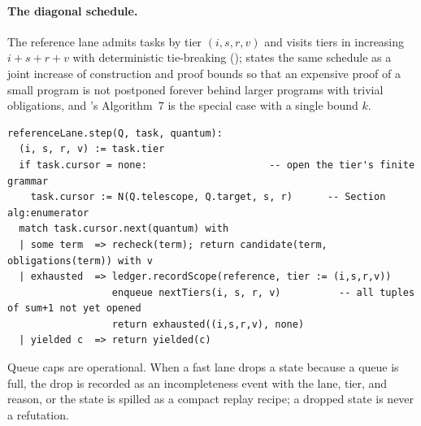 \paragraph{The diagonal schedule.} The reference lane admits tasks by tier $(i,s,r,v)$ and visits tiers in increasing $i+s+r+v$ with deterministic tie-breaking ();  states the same schedule as a joint increase of construction and proof bounds so that an expensive proof of a small program is not postponed forever behind larger programs with trivial obligations, and 's Algorithm~7 is the special case with a single bound $k$.
\begin{lstlisting}
referenceLane.step(Q, task, quantum):
  (i, s, r, v) := task.tier
  if task.cursor = none:                     -- open the tier's finite grammar
    task.cursor := N(Q.telescope, Q.target, s, r)      -- Section alg:enumerator
  match task.cursor.next(quantum) with
  | some term  => recheck(term); return candidate(term, obligations(term)) with v
  | exhausted  => ledger.recordScope(reference, tier := (i,s,r,v))
                  enqueue nextTiers(i, s, r, v)          -- all tuples of sum+1 not yet opened
                  return exhausted((i,s,r,v), none)
  | yielded c  => return yielded(c)
\end{lstlisting}
Queue caps are operational. When a fast lane drops a state because a queue is full, the drop is recorded as an incompleteness event with the lane, tier, and reason, or the state is spilled as a compact replay recipe; a dropped state is never a refutation.

